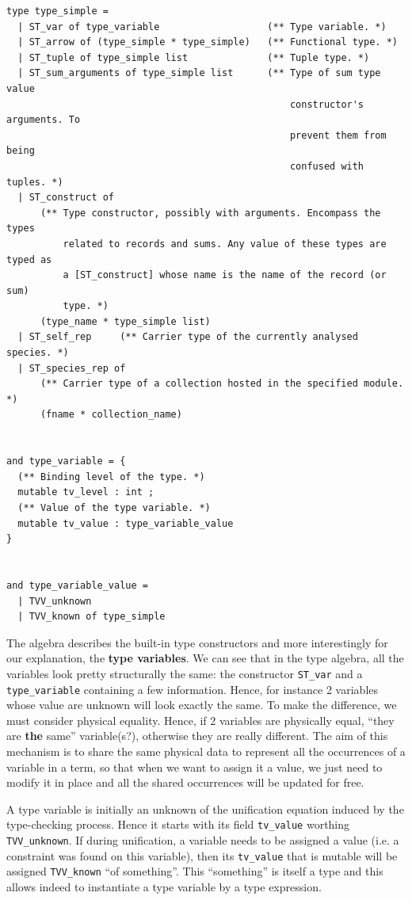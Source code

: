 {\footnotesize
\begin{lstlisting}[language=MyOCaml, title=An ``expression'' AST node]
type type_simple =
  | ST_var of type_variable                   (** Type variable. *)
  | ST_arrow of (type_simple * type_simple)   (** Functional type. *)
  | ST_tuple of type_simple list              (** Tuple type. *)
  | ST_sum_arguments of type_simple list      (** Type of sum type value
                                                  constructor's arguments. To
                                                  prevent them from being
                                                  confused with tuples. *)
  | ST_construct of
      (** Type constructor, possibly with arguments. Encompass the types
          related to records and sums. Any value of these types are typed as
          a [ST_construct] whose name is the name of the record (or sum)
          type. *)
      (type_name * type_simple list)
  | ST_self_rep     (** Carrier type of the currently analysed species. *)
  | ST_species_rep of
      (** Carrier type of a collection hosted in the specified module. *)
      (fname * collection_name)


and type_variable = {
  (** Binding level of the type. *)
  mutable tv_level : int ;
  (** Value of the type variable. *)
  mutable tv_value : type_variable_value
}


and type_variable_value =
  | TVV_unknown
  | TVV_known of type_simple
\end{lstlisting}
}

The algebra describes the built-in type constructors and more
interestingly for our explanation, the {\bf type variables}. We can
see that in the type algebra, all the variables look pretty
structurally the same: the constructor {\tt ST\_var} and a
{\tt type\_variable} containing a few information. Hence, for instance
2 variables whose value are unknown will look exactly the same. To
make the difference, we must consider physical equality. Hence, if 2
variables are physically equal, ``they are {\bf the} same''
variable(s?), otherwise they are really different. The aim of this
mechanism is to share the same physical data to represent all the
occurrences of a variable in a term, so that when we want to assign it
a value, we just need to modify it in place and all the shared
occurrences will be updated for free.

A type variable is initially an unknown of the unification equation
induced by the type-checking process. Hence it starts with its field
{\tt tv\_value} worthing {\tt TVV\_unknown}. If during unification, a
variable needs to be assigned a value (i.e. a constraint was found on
this variable), then its {\tt tv\_value} that is mutable will be
assigned {\tt TVV\_known} ``of something''. This ``something'' is
itself a type and this allows indeed to instantiate a type variable by
a type expression.

